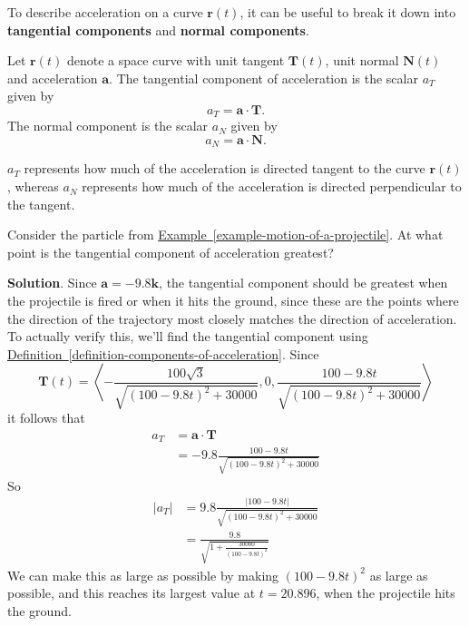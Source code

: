\documentclass[10pt,]{book}
\newcommand{\terminology}[1]{\textbf{#1}}
\theoremstyle{ptxplainnotitle}
\theoremstyle{ptxplaintitle}
\theoremstyle{ptxplainnotitle}
\theoremstyle{ptxplaintitle}
\theoremstyle{ptxplainnotitle}
\theoremstyle{ptxplaintitle}
\theoremstyle{ptxdefinitionnotitle}
\theoremstyle{ptxdefinitiontitle}
\theoremstyle{ptxdefinitionnotitle}
\theoremstyle{ptxdefinitiontitle}
\theoremstyle{ptxdefinitionnotitle}
\theoremstyle{ptxdefinitiontitle}
\theoremstyle{ptxdefinitionnotitle}
\theoremstyle{ptxdefinitiontitle}
\theoremstyle{ptxdefinitionnotitle}
\theoremstyle{ptxdefinitiontitle}
\numberwithin{equation}{section}
\newcommand{\vv}[1]{\mathbf{#1}}
\newcommand{\dotprod}[1]{\left\langle #1 \right\rangle}
\begin{document}
\hypertarget{p-974}{}%
To describe acceleration on a curve \(\vv{r}(t)\), it can be useful to break it down into \terminology{tangential components} and \terminology{normal components}.%
\begin{definition}\label{definition-components-of-acceleration}
\hypertarget{p-975}{}%
Let \(\vv{r}(t)\) denote a space curve with unit tangent \(\vv{T}(t)\), unit normal \(\vv{N}(t)\) and acceleration \(\vv{a}\). The tangential component of acceleration is the scalar \(a_{T}\) given by%
%
\begin{equation*}
a_{T} = \vv{a}\cdot\vv{T}.
\end{equation*}
\hypertarget{p-976}{}%
The normal component is the scalar \(a_{N}\) given by%
%
\begin{equation*}
a_{N} = \vv{a}\cdot\vv{N}.
\end{equation*}
\end{definition}
\hypertarget{p-977}{}%
\(a_{T}\) represents how much of the acceleration is directed tangent to the curve \(\vv{r}(t)\), whereas \(a_{N}\) represents how much of the acceleration is directed perpendicular to the tangent.%
\begin{example}\label{example-components-of-acceleration-for-a-projectile}
\hypertarget{p-978}{}%
Consider the particle from \hyperref[example-motion-of-a-projectile]{Example~\ref{example-motion-of-a-projectile}}. At what point is the tangential component of acceleration greatest?%
\par\smallskip%
\noindent\textbf{Solution}.\hypertarget{solution-148}{}\quad%
\hypertarget{p-979}{}%
Since \(\vv{a} = -9.8\vv{k}\), the tangential component should be greatest when the projectile is fired or when it hits the ground, since these are the points where the direction of the trajectory most closely matches the direction of acceleration. To actually verify this, we'll find the tangential component using \hyperref[definition-components-of-acceleration]{Definition~\ref{definition-components-of-acceleration}}. Since%
%
\begin{equation*}
\vv{T}(t) = \dotprod{-\frac{100\sqrt{3}}{\sqrt{(100-9.8t)^{2}+30000}}, 0, \frac{100 - 9.8t}{\sqrt{(100-9.8t)^{2}+30000}}}
\end{equation*}
\hypertarget{p-980}{}%
it follows that%
%
\begin{align*}
a_{T} & = \vv{a}\cdot\vv{T} \\
& =  -9.8\frac{100 - 9.8t}{\sqrt{(100-9.8t)^{2}+30000}}
\end{align*}
\hypertarget{p-981}{}%
So%
%
\begin{align*}
|a_{T}| & = 9.8\frac{|100 - 9.8t|}{\sqrt{(100-9.8t)^{2}+30000}} \\
& = \frac{9.8}{\sqrt{1+\frac{30000}{(100-9.8t)^{2}}}} 
\end{align*}
\hypertarget{p-982}{}%
We can make this as large as possible by making \((100-9.8t)^{2}\) as large as possible, and this reaches its largest value at \(t = 20.896\), when the projectile hits the ground.%
\end{example}
\end{document}
